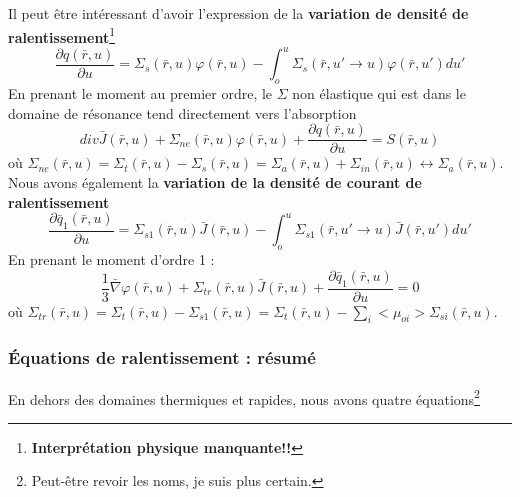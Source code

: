 	Il peut être intéressant d'avoir l'expression de la \textbf{variation de densité de 
	ralentissement}\footnote{\textbf{Interprétation physique manquante!!}}
	\begin{equation}
	\frac{{\partial q(\bar r,u)}}{{\partial u}} = {\Sigma _s}(\bar r,u)\varphi (\bar r,u) - \int_o^u 
	 {\Sigma _s}(\bar r,u' \to u)\varphi (\bar r,u')du'
	\end{equation}
	En prenant le moment au premier ordre, le $\Sigma$ non élastique qui est dans le domaine de
	résonance tend directement vers l'absorption
	\begin{equation}
	div\bar J(\bar r,u) + {\Sigma _{ne}}(\bar r,u)\varphi (\bar r,u) + \frac{{\partial q(\bar r,u)}}
	{{\partial u}} = S(\bar r,u)
	\end{equation}
	où ${\Sigma _{ne}}(\bar r,u) = {\Sigma _t}(\bar r,u) - {\Sigma _s}(\bar r,u) = {\Sigma _a}(\bar
	 r,u) + {\Sigma _{in}}(\bar r,u)\longleftrightarrow{\Sigma _a}(\bar r,u)$.\\
	 
	 Nous avons également la \textbf{variation de la densité de courant de ralentissement}
	 \begin{equation}
	 \frac{{\partial {{\bar q}_1}(\bar r,u)}}{{\partial u}} = {\Sigma _{s1}}(\bar r,u)\bar J(\bar r,u)
	  - \int_o^u  {\Sigma _{s1}}(\bar r,u' \to u)\bar J(\bar r,u')du'
	 \end{equation}
	 En prenant le moment d'ordre 1 : 
	 \begin{equation}
	 \frac{1}{3}\bar \nabla \varphi (\bar r,u) + {\Sigma _{tr}}(\bar r,u)\bar J(\bar
	  r,u) + \frac{{\partial {{\bar q}_1}(\bar r,u)}}{{\partial u}} = 0
	 \end{equation}
	 où ${\Sigma _{tr}}(\bar r,u) = {\Sigma _t}(\bar r,u) - {\Sigma _{s1}}(\bar r,u) = {\Sigma _t}
	 (\bar r,u) - \sum\limits_i     < {\mu _{oi}} > {\Sigma _{si}}(\bar r,u)$.
	 
	 \subsubsection{Équations de ralentissement : résumé}
	 En dehors des domaines thermiques et rapides, nous avons quatre équations\footnote{Peut-être
	 revoir les noms, je suis plus certain.}\\
	 
